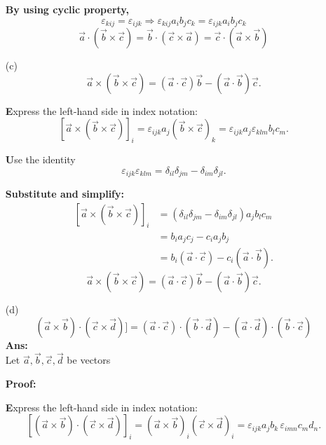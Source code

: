 \documentclass[a4paper,12pt]{article}
\begin{document}
\begin{enumerate}
\textbf{ By using cyclic property, }
\[
\varepsilon_{kij} = \varepsilon_{ijk}
\Rightarrow \varepsilon_{kij} a_i b_j c_k = \varepsilon_{ijk} a_i b_j c_k
\]
\[
\boxed{
\vec{a} \cdot (\vec{b} \times \vec{c}) = 
\vec{b} \cdot (\vec{c} \times \vec{a}) = 
\vec{c} \cdot (\vec{a} \times \vec{b})
}
\]













\item[(c)] 
\[
\vec{a} \times (\vec{b} \times \vec{c}) = (\vec{a} \cdot \vec{c}) \vec{b} - (\vec{a} \cdot \vec{b}) \vec{c}.
\]

\vspace{10pt}

\textbf Express the left-hand side in index notation:
\[
\left[\vec{a} \times (\vec{b} \times \vec{c})\right]_i = \varepsilon_{ijk} a_j (\vec{b} \times \vec{c})_k = \varepsilon_{ijk} a_j \varepsilon_{klm} b_l c_m.
\]

\vspace{5pt}

\textbf Use the identity
\[\boxed{
\varepsilon_{ijk} \varepsilon_{klm} = \delta_{il} \delta_{jm} - \delta_{im} \delta_{jl}}.
\]


\textbf{Substitute and simplify:}
\[
\begin{aligned}
[\vec{a} \times (\vec{b} \times \vec{c})]_i 
&= (\delta_{il} \delta_{jm} - \delta_{im} \delta_{jl}) a_j b_l c_m \\
&= b_i a_j c_j - c_i a_j b_j \\
&= b_i (\vec{a} \cdot \vec{c}) - c_i (\vec{a} \cdot \vec{b}).
\end{aligned}
\]
\[
\boxed{
\vec{a} \times (\vec{b} \times \vec{c}) = (\vec{a} \cdot \vec{c}) \vec{b} - (\vec{a} \cdot \vec{b}) \vec{c}.
}
\]







\item[(d)]\[(\vec{a}\times \vec{b}) \cdot (\vec{c} \times \vec{d})] = (\vec{a} \cdot \vec{c}) \cdot (\vec{b}\cdot \vec{d}) - (\vec{a} \cdot \vec{d}) \cdot (\vec{b} \cdot \vec{c})
\]
\textbf{Ans:}\\
Let \(\vec{a}, \vec{b}, \vec{c}, \vec{d}\) be vectors


\textbf{Proof:}

\textbf Express the left-hand side in index notation:
\[
[(\vec{a} \times \vec{b}) \cdot (\vec{c} \times \vec{d})]_i = (\vec{a} \times \vec{b})_i (\vec{c} \times \vec{d})_i = \varepsilon_{ijk} a_j b_k \, \varepsilon_{imn} c_m d_n.
\]


\end{enumerate}
\end{document}
